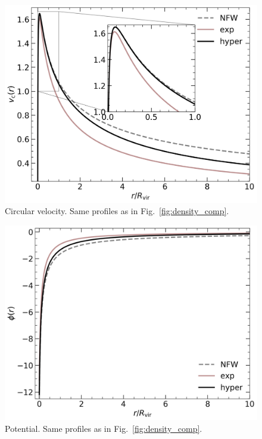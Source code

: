 \documentclass[twocolumn, a4paper]{article}
\begin{document}
\begin{figure}
    \centering
    \includegraphics[width=\columnwidth]{images/v_circ_comparison.png}
    \caption{Circular velocity. Same profiles as in Fig.~\ref{fig:density_comp}.}
    \label{fig:v_circ_comp}
\end{figure}

\begin{figure}
    \centering
    \includegraphics[width=\columnwidth]{images/potential_comparison.png}
    \caption{Potential. Same profiles as in Fig.~\ref{fig:density_comp}.}
    \label{fig:potential_comp}
\end{figure}
\end{document}
